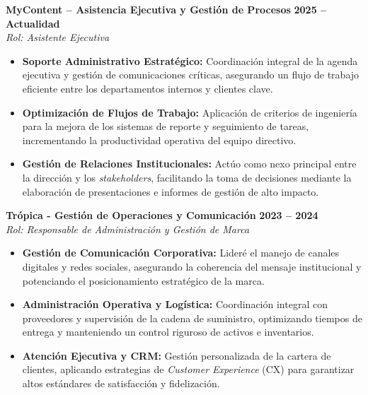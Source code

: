 \documentclass[11pt,a4paper,sans]{article}
\begin{document}
\noindent \textbf{MyContent – Asistencia Ejecutiva y Gestión de Procesos} \hfill \textbf{2025 -- Actualidad} \\
\textit{Rol: Asistente Ejecutiva}
\begin{itemize}[leftmargin=1.5em, labelsep=0.5em, itemsep=4pt]
    \item \textbf{Soporte Administrativo Estratégico:} Coordinación integral de la agenda ejecutiva y gestión de comunicaciones críticas, asegurando un flujo de trabajo eficiente entre los departamentos internos y clientes clave.
    \item \textbf{Optimización de Flujos de Trabajo:} Aplicación de criterios de ingeniería para la mejora de los sistemas de reporte y seguimiento de tareas, incrementando la productividad operativa del equipo directivo.
    \item \textbf{Gestión de Relaciones Institucionales:} Actúo como nexo principal entre la dirección y los \textit{stakeholders}, facilitando la toma de decisiones mediante la elaboración de presentaciones e informes de gestión de alto impacto.
\end{itemize}

\vspace{10pt}

\noindent \textbf{Trópica - Gestión de Operaciones y Comunicación} \hfill \textbf{2023 -- 2024} \\
\textit{Rol: Responsable de Administración y Gestión de Marca}
\begin{itemize}[leftmargin=1.5em, labelsep=0.5em, itemsep=4pt]
    \item \textbf{Gestión de Comunicación Corporativa:} Lideré el manejo de canales digitales y redes sociales, asegurando la coherencia del mensaje institucional y potenciando el posicionamiento estratégico de la marca.
    \item \textbf{Administración Operativa y Logística:} Coordinación integral con proveedores y supervisión de la cadena de suministro, optimizando tiempos de entrega y manteniendo un control riguroso de activos e inventarios.
    \item \textbf{Atención Ejecutiva y CRM:} Gestión personalizada de la cartera de clientes, aplicando estrategias de \textit{Customer Experience} (CX) para garantizar altos estándares de satisfacción y fidelización.
\end{itemize}

\vspace{10pt}
\end{document}
